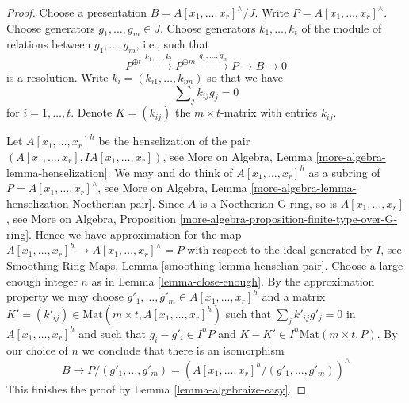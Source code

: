 \documentclass[10pt,a4paper]{amsart}
\theoremstyle{plain}
\theoremstyle{definition}
\theoremstyle{remark}
\numberwithin{equation}{subsection}
\begin{document}
\begin{proof}
Choose a presentation $B = A[x_1, \ldots, x_r]^\wedge/J$. Write
$P = A[x_1, \ldots, x_r]^\wedge$. Choose generators $g_1, \ldots, g_m \in J$.
Choose generators $k_1, \ldots, k_t$ of the module
of relations between $g_1, \ldots, g_m$, i.e., such that
$$
P^{\oplus t} \xrightarrow{k_1, \ldots, k_t}
P^{\oplus m} \xrightarrow{g_1, \ldots, g_m}
P \to B \to 0
$$
is a resolution. Write $k_i = (k_{i1}, \ldots, k_{im})$ so that we have
\begin{equation}
\label{equation-relations-straight-up}
\sum\nolimits_j k_{ij}g_j = 0
\end{equation}
for $i = 1, \ldots, t$. Denote $K = (k_{ij})$ the $m \times t$-matrix
with entries $k_{ij}$.

\medskip\noindent
Let $A[x_1, \ldots, x_r]^h$ be the henselization of the
pair $(A[x_1, \ldots, x_r], IA[x_1, \ldots, x_r])$, see
More on Algebra, Lemma \ref{more-algebra-lemma-henselization}.
We may and do think of $A[x_1, \ldots, x_r]^h$ as a subring
of $P = A[x_1, \ldots, x_r]^\wedge$, see
More on Algebra, Lemma
\ref{more-algebra-lemma-henselization-Noetherian-pair}.
Since $A$ is a Noetherian G-ring, so is $A[x_1, \ldots, x_r]$, see
More on Algebra, Proposition
\ref{more-algebra-proposition-finite-type-over-G-ring}.
Hence we have approximation for the map
$A[x_1, \ldots, x_r]^h \to A[x_1, \ldots, x_r]^\wedge = P$
with respect to the ideal generated by $I$, see
Smoothing Ring Maps, Lemma \ref{smoothing-lemma-henselian-pair}.
Choose a large enough integer $n$ as in Lemma \ref{lemma-close-enough}.
By the approximation property we may choose
$g'_1, \ldots, g'_m \in A[x_1, \ldots, x_r]^h$
and a matrix
$K' = (k'_{ij}) \in \text{Mat}(m \times t, A[x_1, \ldots, x_r]^h)$
such that $\sum\nolimits_j k'_{ij}g'_j = 0$ in
$A[x_1, \ldots, x_r]^h$ and such that
$g_i - g'_i \in I^nP$ and $K - K' \in I^n\text{Mat}(m \times t, P)$.
By our choice of $n$ we conclude that there is an isomorphism
$$
B \to P/(g'_1, \ldots, g'_m) =
\left(A[x_1, \ldots, x_r]^h/(g'_1, \ldots, g'_m)\right)^\wedge
$$
This finishes the proof by Lemma \ref{lemma-algebraize-easy}.
\end{proof}
\end{document}
